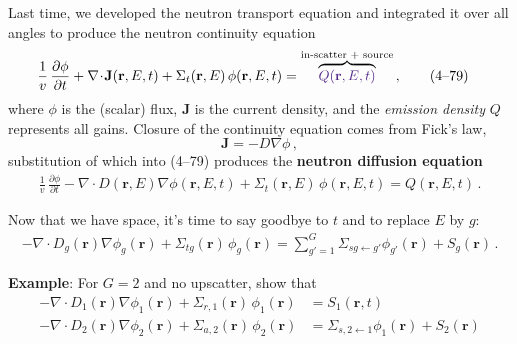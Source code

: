 \documentclass[compact]{ne630handout}
\begin{document}
\begin{handoutflow}


Last time, we developed the neutron transport equation and integrated it
over all angles to produce the neutron continuity equation
\begin{align*}
  \frac{1}{v}\,\frac{\partial \phi}{\partial t}
  &+ \nabla\!\cdot\! \mathbf{J}(\mathbf{r},E,t)
   +\Sigma_t(\mathbf{r},E)\, \phi(\mathbf{r},E,t) = \overbrace{\textcolor{wcprimary}{Q(\mathbf{r}, E, t)}}^{\text{in-scatter + source}} \, ,
  \tag{4--79}
\end{align*}
where $\phi$ is the (scalar) flux, $\mathbf{J}$ is the current density, and
the {\it emission density} $Q$ represents all \textcolor{wcprimary}{gains}.
Closure of the continuity equation  comes from Fick's law,
\begin{equation*}
\tag{FNRP 6.11}
   \mathbf{J} = -D \nabla \phi \, ,
\end{equation*}
substitution of which into (4--79) produces the {\bf neutron diffusion equation}
\begin{align*}
  \frac{1}{v}\,\frac{\partial \phi}{\partial t}
  - \nabla\!\cdot\! D(\mathbf{r},E) \nabla \phi(\mathbf{r},E,t)
   +\Sigma_t(\mathbf{r},E)\, \phi(\mathbf{r},E,t)
  = Q(\mathbf{r}, E, t)\, .
\end{align*}

Now that we have space, it's time to say goodbye to $t$ and to
replace $E$ by $g$:
\begin{align*}
 - \nabla\!\cdot\! D_g(\mathbf{r}) \nabla \phi_g(\mathbf{r})
   + \Sigma_{tg}(\mathbf{r})\, \phi_g(\mathbf{r})
  = \sum_{g'=1}^{G} \Sigma_{sg\gets g'} \phi_{g'}(\mathbf{r}) +  S_g(\mathbf{r}) \, .
\end{align*}

{\bf Example}: For $G=2$ and no upscatter, show that
\begin{align*}
 - \nabla\!\cdot\! D_1(\mathbf{r}) \nabla \phi_1(\mathbf{r})
   + \Sigma_{r,1}(\mathbf{r})\, \phi_1(\mathbf{r})
  &=  S_1(\mathbf{r},t) \\
 - \nabla\!\cdot\! D_2(\mathbf{r}) \nabla \phi_2(\mathbf{r})
   + \Sigma_{a,2}(\mathbf{r})\, \phi_2(\mathbf{r})
  &=  \Sigma_{s,2\gets 1} \phi_{1}(\mathbf{r}) + S_2(\mathbf{r})
\end{align*}


\end{handoutflow}
\end{document}

